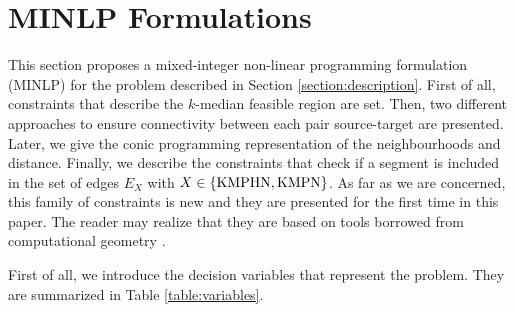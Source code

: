 \documentclass[a4paper,  review, authoryear, 1p.]{elsarticle}
\newcommand{\JP}[1]{{\color{armygreen}#1}}
\begin{document}
	\section{MINLP Formulations}\label{section:formulations}
	
	This section proposes a mixed-integer non-linear programming formulation (MINLP) for the problem described in Section \ref{section:description}. First of all, constraints that describe the $k$-median feasible region are set. Then, two different approaches to ensure connectivity between each pair source-target are presented. Later, we give the conic programming representation of the neighbourhoods and distance. Finally, we describe the constraints that check if a segment is included in the set of edges $E_X$ with $X\in \{\rm KMPHN, \rm KMPN\}$. \JP{As far as we are concerned, this family of constraints is new and they are presented for the first time in this paper. The reader may realize that they are based on tools borrowed from computational geometry \citep{deberg1990,daescu2008}. }
		
		
	First of all, we introduce the decision variables that represent the problem. They are summarized in Table \ref{table:variables}.
	
\end{document}
